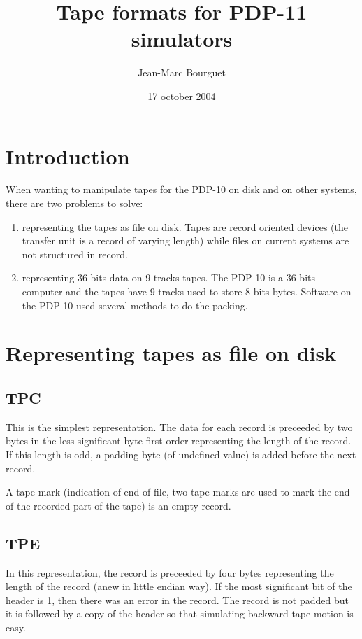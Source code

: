 \documentclass[a4paper,12pt]{article}
\title{Tape formats for PDP-11 simulators}
\author{Jean-Marc Bourguet}
\date{17 october 2004}
\begin{document}
\maketitle

\section{Introduction}

When wanting to manipulate tapes for the PDP-10 on disk and on other
systems, there are two problems to solve:
\begin{enumerate}
\item representing the tapes as file on disk.  Tapes are record oriented
  devices (the transfer unit is a record of varying length) while files on
  current systems are not structured in record.
\item representing 36 bits data on 9 tracks tapes.  The PDP-10 is a 36 bits
  computer and the tapes have 9 tracks used to store 8 bits bytes.
  Software on the PDP-10 used several methods to do the packing.
\end{enumerate}

\section{Representing tapes as file on disk}

\subsection{TPC}

This is the simplest representation.  The data for each record is preceeded
by two bytes in the less significant byte first order representing the
length of the record.  If this length is odd, a padding byte (of undefined
value) is added before the next record.

A tape mark (indication of end of file, two tape marks are used to mark the
end of the recorded part of the tape) is an empty record.

\subsection{TPE}

In this representation, the record is preceeded by four bytes representing
the length of the record (anew in little endian way).  If the most
significant bit of the header is 1, then there was an error in the record.
The record is not padded but it is followed by a copy of the header so that
simulating backward tape motion is easy.
\end{document}
